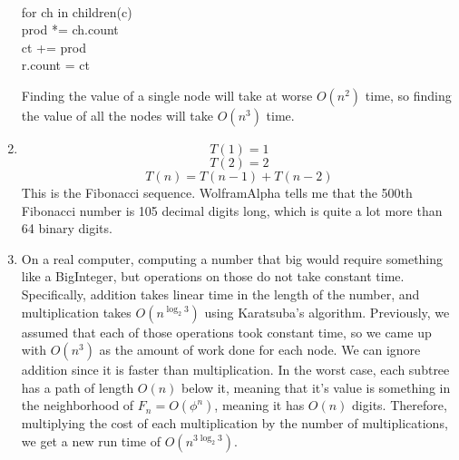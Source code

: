\documentclass[11pt]{article}
\begin{document}
\begin{solution}
\begin{enumerate}
\begin{algo}
                \\ for ch in children(c) \+
                \\ prod *= ch.count \-
                \\ ct += prod \-
                \\ r.count = ct \-
            \end{algo}
            Finding the value of a single node will take at worse $O(n^2)$ time, so finding the value of all the nodes will take $O(n^3)$ time.
        \item 
            \[
                T(1) = 1
            \]
            \[
            T(2) = 2
            \]
            \[
            T(n) = T(n - 1) + T(n - 2)
            \]
            This is the Fibonacci sequence. WolframAlpha tells me that the 500th Fibonacci number is 105 decimal digits long, which is quite a lot more than 64 binary digits.
        \item On a real computer, computing a number that big would require something like a BigInteger, but operations on those do not take constant time. Specifically, addition takes linear time in the length of the number, and multiplication takes $O(n^{\log_2{3}})$ using Karatsuba's algorithm. Previously, we assumed that each of those operations took constant time, so we came up with $O(n^3)$ as the amount of work done for each node. We can ignore addition since it is faster than multiplication. In the worst case, each subtree has a path of length $O(n)$ below it, meaning that it's value is something in the neighborhood of $F_n = O(\phi^n)$, meaning it has $O(n)$ digits. Therefore, multiplying the cost of each multiplication by the number of multiplications, we get a new run time of $O(n^{3\log_2{3}})$.
    \end{enumerate}
\end{solution}
\end{document}
